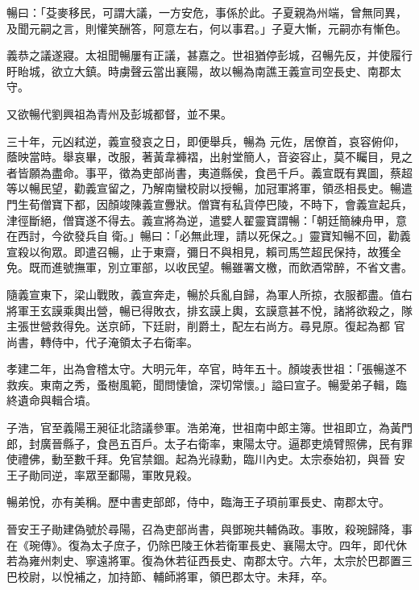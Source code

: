 \begin{pinyinscope}
 暢曰：「芟麥移民，可謂大議，一方安危，事係於此。子夏親為州端，曾無同異，及聞元嗣之言，則懽笑酬答，阿意左右，何以事君。」子夏大慚，元嗣亦有慚色。



 義恭之議遂寢。太祖聞暢屢有正議，甚嘉之。世祖猶停彭城，召暢先反，并使履行盱眙城，欲立大鎮。時虜聲云當出襄陽，故以暢為南譙王義宣司空長史、南郡太守。



 又欲暢代劉興祖為青州及彭城都督，並不果。



 三十年，元凶弒逆，義宣發哀之日，即便舉兵，暢為
 元佐，居僚首，哀容俯仰，蔭映當時。舉哀畢，改服，著黃韋褲褶，出射堂簡人，音姿容止，莫不矚目，見之者皆願為盡命。事平，徵為吏部尚書，夷道縣侯，食邑千戶。義宣既有異圖，蔡超等以暢民望，勸義宣留之，乃解南蠻校尉以授暢，加冠軍將軍，領丞相長史。暢遣門生荀僧寶下都，因顏竣陳義宣釁狀。僧寶有私貨停巴陵，不時下，會義宣起兵，津徑斷絕，僧寶遂不得去。義宣將為逆，遣嬖人翟靈寶謂暢：「朝廷簡練舟甲，意在西討，今欲發兵自
 衛。」暢曰：「必無此理，請以死保之。」靈寶知暢不回，勸義宣殺以徇眾。即遣召暢，止于東齋，彌日不與相見，賴司馬竺超民保持，故獲全免。既而進號撫軍，別立軍部，以收民望。暢雖署文檄，而飲酒常醉，不省文書。



 隨義宣東下，梁山戰敗，義宣奔走，暢於兵亂自歸，為軍人所掠，衣服都盡。值右將軍王玄謨乘輿出營，暢已得敗衣，排玄謨上輿，玄謨意甚不悅，諸將欲殺之，隊主張世營救得免。送京師，下廷尉，削爵土，配左右尚方。尋見原。復起為都
 官尚書，轉侍中，代子淹領太子右衛率。



 孝建二年，出為會稽太守。大明元年，卒官，時年五十。顏竣表世祖：「張暢遂不救疾。東南之秀，蚤樹風範，聞問悽愴，深切常懷。」謚曰宣子。暢愛弟子輯，臨終遺命與輯合墳。



 子浩，官至義陽王昶征北諮議參軍。浩弟淹，世祖南中郎主簿。世祖即立，為黃門郎，封廣晉縣子，食邑五百戶。太子右衛率，東陽太守。逼郡吏燒臂照佛，民有罪使禮佛，動至數千拜。免官禁錮。起為光祿勳，臨川內史。太宗泰始初，與晉
 安王子勛同逆，率眾至鄱陽，軍敗見殺。



 暢弟悅，亦有美稱。歷中書吏部郎，侍中，臨海王子頊前軍長史、南郡太守。



 晉安王子勛建偽號於尋陽，召為吏部尚書，與鄧琬共輔偽政。事敗，殺琬歸降，事在《琬傳》。復為太子庶子，仍除巴陵王休若衛軍長史、襄陽太守。四年，即代休若為雍州刺史、寧遠將軍。復為休若征西長史、南郡太守。六年，太宗於巴郡置三巴校尉，以悅補之，加持節、輔師將軍，領巴郡太守。未拜，卒。




\end{pinyinscope}
